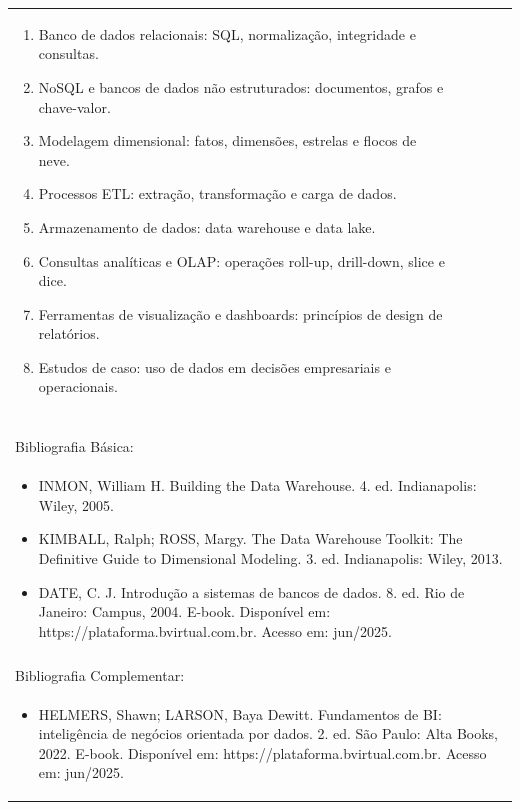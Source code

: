 \documentclass[11pt]{article}
\begin{document}
\begin{center}
\begin{longtable}{|p{4cm}|p{4cm}|p{4cm}|p{4cm}|}
{\begin{enumerate}
\item Banco de dados relacionais: SQL, normalização, integridade e consultas.
\item NoSQL e bancos de dados não estruturados: documentos, grafos e chave-valor.
\item Modelagem dimensional: fatos, dimensões, estrelas e flocos de neve.
\item Processos ETL: extração, transformação e carga de dados.
\item Armazenamento de dados: data warehouse e data lake.
\item Consultas analíticas e OLAP: operações roll-up, drill-down, slice e dice.
\item Ferramentas de visualização e dashboards: princípios de design de relatórios.
\item Estudos de caso: uso de dados em decisões empresariais e operacionais.\end{enumerate}}\\
\multicolumn{4}{|p{16cm}|}{}\\
\multicolumn{4}{|p{16cm}|}{}\\
\multicolumn{4}{|p{16cm}|}{\vspace{-1cm}}\\
\multicolumn{4}{|p{16cm}|}{}\\
\hline
\multicolumn{4}{|p{16cm}|}{Bibliografia Básica:}\\
\multicolumn{4}{|p{16cm}|}{%
\begin{itemize}\item INMON, William H. Building the Data Warehouse. 4. ed. Indianapolis: Wiley, 2005.
\item KIMBALL, Ralph; ROSS, Margy. The Data Warehouse Toolkit: The Definitive Guide to Dimensional Modeling. 3. ed. Indianapolis: Wiley, 2013.
\item DATE, C. J. Introdução a sistemas de bancos de dados. 8. ed. Rio de Janeiro: Campus, 2004. E-book. Disponível em: https://plataforma.bvirtual.com.br. Acesso em: jun/2025.\end{itemize}}\\
\multicolumn{4}{|p{16cm}|}{}\\
\hline
\multicolumn{4}{|p{16cm}|}{Bibliografia Complementar:}\\
\multicolumn{4}{|p{16cm}|}{%
\begin{itemize}\item HELMERS, Shawn; LARSON, Baya Dewitt. Fundamentos de BI: inteligência de negócios orientada por dados. 2. ed. São Paulo: Alta Books, 2022. E-book. Disponível em: https://plataforma.bvirtual.com.br. Acesso em: jun/2025.

\end{itemize}}
\end{longtable}
\end{center}
\end{document}
